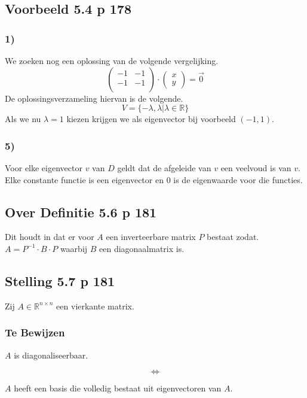\documentclass[lineaire_algebra_oplossingen.tex]{subfiles}
\begin{document}
\subsection{Voorbeeld 5.4 p 178}
\subsubsection*{1)}
We zoeken nog een oplossing van de volgende vergelijking.
\[
\begin{pmatrix}
-1 & -1\\
-1 & -1\\
\end{pmatrix}
\cdot
\begin{pmatrix}
x\\y
\end{pmatrix}
=
\vec{0}
\]
De oplossingsverzameling hiervan is de volgende.
\[
V = \{-\lambda,\lambda|\lambda\in\mathbb{R}\}
\]
Als we nu $\lambda = 1$ kiezen krijgen we als eigenvector bij voorbeeld $(-1,1)$.

\subsubsection*{5)}
Voor elke eigenvector $v$ van $D$ geldt dat de afgeleide van $v$ een veelvoud is van $v$. Elke constante functie is een eigenvector en $0$ is de eigenwaarde voor die functies.

\subsection{Over Definitie 5.6 p 181}
Dit houdt in dat er voor $A$ een inverteerbare matrix $P$ bestaat zodat. $A = P^{-1}\cdot B\cdot P$ waarbij $B$ een diagonaalmatrix is.

\subsection{Stelling 5.7 p 181}
Zij $A \in \mathbb{R}^{n\times n}$ een vierkante matrix.
\subsubsection*{Te Bewijzen}
\begin{center}
$A$ is diagonaliseerbaar.
\end{center}
\[\Leftrightarrow\]
\begin{center}
$A$ heeft een basis die volledig bestaat uit eigenvectoren van $A$.
\end{center}
\end{document}
